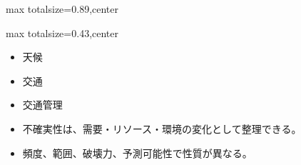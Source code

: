 \begin{minipage}[t]{0.58\textwidth}
\begin{adjustbox}{max totalsize={\textwidth}{0.89\textheight},center}
\begin{minipage}{\textwidth}
\end{minipage}
\end{adjustbox}
\end{minipage}


\clearpage
{}
\begin{minipage}[t]{0.405\textwidth}
\begin{adjustbox}{max totalsize={\textwidth}{0.43\textheight},center}
\begin{minipage}{\textwidth}\scriptsize
{}\begin{itemize}
\item 天候
\item 交通
\item 交通管理
\end{itemize}\begin{itemize}
\item 不確実性は、需要・リソース・環境の変化として整理できる。
\item 頻度、範囲、破壊力、予測可能性で性質が異なる。
\end{itemize}
\end{minipage}
\end{adjustbox}
\end{minipage}\hfill
